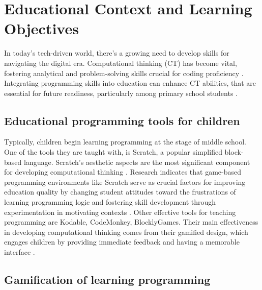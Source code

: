\section{Educational Context and Learning Objectives}

In today's tech-driven world, there's a growing need to develop skills for navigating the digital era. 
Computational thinking (CT) has become vital, fostering analytical and problem-solving skills crucial for coding proficiency \cite{tsai_developing_2019}. 
Integrating programming skills into education can enhance CT abilities, that are essential for future readiness, particularly among primary school students \cite{popat_learning_2019}.

\subsection{Educational programming tools for children}

Typically, children begin learning programming at the stage of middle school. 
One of the tools they are taught with, is Scratch, a popular simplified block-based language. 
Scratch's aesthetic aspects are the most significant component for developing computational thinking \cite{oscco_solorzano_analysis_2025}. 
Research indicates that game-based programming environments like Scratch serve as crucial factors for improving education quality by changing student attitudes toward the frustrations of learning programming logic and fostering skill development through experimentation in motivating contexts \cite{kuz_computational_2023}. 
Other effective tools for teaching programming are Kodable, CodeMonkey, BlocklyGames. 
Their main effectiveness in developing computational thinking comes from their gamified design, which engages children by providing immediate feedback and having a memorable interface \cite{hlazova_integration_2024}.

\subsection{Gamification of learning programming}

